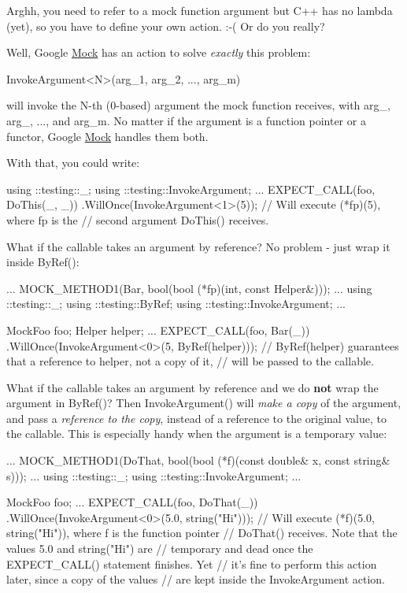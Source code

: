 Arghh, you need to refer to a mock function argument but C++ has no lambda (yet), so you have to define your own action. \+:-\/( Or do you really?

Well, Google \hyperlink{class_mock}{Mock} has an action to solve {\itshape exactly} this problem\+:


\begin{DoxyCode}
InvokeArgument<N>(arg\_1, arg\_2, ..., arg\_m)
\end{DoxyCode}


will invoke the {\ttfamily N}-\/th (0-\/based) argument the mock function receives, with {\ttfamily arg\+\_}, {\ttfamily arg\+\_}, ..., and {\ttfamily arg\+\_\+m}. No matter if the argument is a function pointer or a functor, Google \hyperlink{class_mock}{Mock} handles them both.

With that, you could write\+:


\begin{DoxyCode}
using ::testing::\_;
using ::testing::InvokeArgument;
...
  EXPECT\_CALL(foo, DoThis(\_, \_))
      .WillOnce(InvokeArgument<1>(5));
  // Will execute (*fp)(5), where fp is the
  // second argument DoThis() receives.
\end{DoxyCode}


What if the callable takes an argument by reference? No problem -\/ just wrap it inside {\ttfamily By\+Ref()}\+:


\begin{DoxyCode}
...
  MOCK\_METHOD1(Bar, bool(bool (*fp)(int, const Helper&)));
...
using ::testing::\_;
using ::testing::ByRef;
using ::testing::InvokeArgument;
...

  MockFoo foo;
  Helper helper;
  ...
  EXPECT\_CALL(foo, Bar(\_))
      .WillOnce(InvokeArgument<0>(5, ByRef(helper)));
  // ByRef(helper) guarantees that a reference to helper, not a copy of it,
  // will be passed to the callable.
\end{DoxyCode}


What if the callable takes an argument by reference and we do {\bfseries not} wrap the argument in {\ttfamily By\+Ref()}? Then {\ttfamily Invoke\+Argument()} will {\itshape make a copy} of the argument, and pass a {\itshape reference to the copy}, instead of a reference to the original value, to the callable. This is especially handy when the argument is a temporary value\+:


\begin{DoxyCode}
...
  MOCK\_METHOD1(DoThat, bool(bool (*f)(const double& x, const string& s)));
...
using ::testing::\_;
using ::testing::InvokeArgument;
...

  MockFoo foo;
  ...
  EXPECT\_CALL(foo, DoThat(\_))
      .WillOnce(InvokeArgument<0>(5.0, string("Hi")));
  // Will execute (*f)(5.0, string("Hi")), where f is the function pointer
  // DoThat() receives.  Note that the values 5.0 and string("Hi") are
  // temporary and dead once the EXPECT\_CALL() statement finishes.  Yet
  // it's fine to perform this action later, since a copy of the values
  // are kept inside the InvokeArgument action.
\end{DoxyCode}


